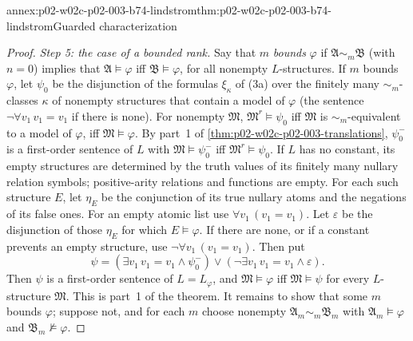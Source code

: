 \begin{annexitem}{annex:p02-w02c-p02-003-b74-lindstrom}{thm:p02-w02c-p02-003-b74-lindstrom}{Guarded characterization}
\begin{proof}
\emph{Step 5: the case of a bounded rank.}  Say that \(m\) \emph{bounds}
\(\varphi\) if \(\mathfrak A\sim_m\mathfrak B\) (with \(n=0\)) implies that
\(\mathfrak A\models\varphi\) iff \(\mathfrak B\models\varphi\), for all
nonempty \(L\)-structures.  If \(m\) bounds \(\varphi\), let \(\psi_0\) be
the disjunction of the formulas \(\xi_\kappa\) of (3a) over the finitely
many \(\sim_m\)-classes \(\kappa\) of nonempty structures that contain a
model of \(\varphi\) (the sentence \(\neg\forall v_1\,v_1=v_1\) if there
is none).  For nonempty \(\mathfrak M\), \(\mathfrak M^{r}\models\psi_0\) iff
\(\mathfrak M\) is \(\sim_m\)-equivalent to a model of \(\varphi\), iff
\(\mathfrak M\models\varphi\).  By part~1 of
\cref{thm:p02-w02c-p02-003-translations}, \(\psi_0^{-}\) is a first-order
sentence of \(L\) with \(\mathfrak M\models\psi_0^{-}\) iff
\(\mathfrak M^{r}\models\psi_0\).  If \(L\) has no constant, its empty structures are determined by
      the truth values of its finitely many nullary relation symbols;
      positive-arity relations and functions are empty. For each such
      structure \(E\), let \(\eta_E\) be the conjunction of its true
      nullary atoms and the negations of its false ones. For an empty
      atomic list use \(\forall v_1\,(v_1=v_1)\). Let \(\varepsilon\)
      be the disjunction of those \(\eta_E\) for which
      \(E\models\varphi\). If there are none, or if a constant prevents
      an empty structure, use \(\neg\forall v_1\,(v_1=v_1)\).
      Then put
\[
 \psi=(\exists v_1\,v_1=v_1\land\psi_0^{-})\lor(\neg\exists v_1\,v_1=v_1\land\varepsilon).
\]
Then \(\psi\) is a first-order sentence of \(L=L_\varphi\), and
\(\mathfrak M\models\varphi\) iff \(\mathfrak M\models\psi\) for every
\(L\)-structure \(\mathfrak M\).  This is part~1 of the theorem.  It
remains to show that some \(m\) bounds \(\varphi\); suppose not, and for
each \(m\) choose nonempty \(\mathfrak A_m\sim_m\mathfrak B_m\) with
\(\mathfrak A_m\models\varphi\) and \(\mathfrak B_m\not\models\varphi\).


\end{proof}
\end{annexitem}
